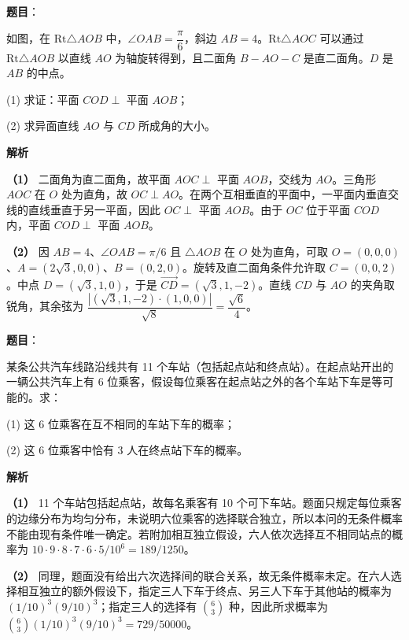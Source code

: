 \begin{answer}

\textbf{题目}：

如图，在 $\mathrm{Rt}\triangle AOB$ 中，$\angle OAB=\dfrac{\pi}{6}$，斜边 $AB=4$。$\mathrm{Rt}\triangle AOC$ 可以通过 $\mathrm{Rt}\triangle AOB$ 以直线 $AO$ 为轴旋转得到，且二面角 $B-AO-C$ 是直二面角。$D$ 是 $AB$ 的中点。

(1) 求证：平面 $COD\perp$ 平面 $AOB$；

(2) 求异面直线 $AO$ 与 $CD$ 所成角的大小。
\nopagebreak[4]
\begin{center}\end{center}
\nopagebreak[4]
\textbf{解析}

\textbf{（1）} 二面角为直二面角，故平面 $AOC\perp$ 平面 $AOB$，交线为 $AO$。三角形 $AOC$ 在 $O$ 处为直角，故 $OC\perp AO$。在两个互相垂直的平面中，一平面内垂直交线的直线垂直于另一平面，因此 $OC\perp$ 平面 $AOB$。由于 $OC$ 位于平面 $COD$ 内，平面 $COD\perp$ 平面 $AOB$。

\textbf{（2）} 因 $AB=4$、$\angle OAB=\pi/6$ 且 $\triangle AOB$ 在 $O$ 处为直角，可取 $O=(0,0,0)$、$A=(2\sqrt3,0,0)$、$B=(0,2,0)$。旋转及直二面角条件允许取 $C=(0,0,2)$。中点 $D=(\sqrt3,1,0)$，于是 $\overrightarrow{CD}=(\sqrt3,1,-2)$。直线 $CD$ 与 $AO$ 的夹角取锐角，其余弦为 $\dfrac{|(\sqrt3,1,-2)\cdot(1,0,0)|}{\sqrt8}=\dfrac{\sqrt6}{4}$。



\end{answer}
\begin{answer}

\textbf{题目}：

某条公共汽车线路沿线共有 11 个车站（包括起点站和终点站）。在起点站开出的一辆公共汽车上有 6 位乘客，假设每位乘客在起点站之外的各个车站下车是等可能的。求：

(1) 这 6 位乘客在互不相同的车站下车的概率；

(2) 这 6 位乘客中恰有 3 人在终点站下车的概率。

\textbf{解析}

\textbf{（1）} 11 个车站包括起点站，故每名乘客有 10 个可下车站。题面只规定每位乘客的边缘分布为均匀分布，未说明六位乘客的选择联合独立，所以本问的无条件概率不能由现有条件唯一确定。若附加相互独立假设，六人依次选择互不相同站点的概率为 $10\cdot9\cdot8\cdot7\cdot6\cdot5/10^6=189/1250$。

\textbf{（2）} 同理，题面没有给出六次选择间的联合关系，故无条件概率未定。在六人选择相互独立的额外假设下，指定三人下车于终点、另三人下车于其他站的概率为 $(1/10)^3(9/10)^3$；指定三人的选择有 $\binom63$ 种，因此所求概率为 $\binom63(1/10)^3(9/10)^3=729/50000$。



\end{answer}
